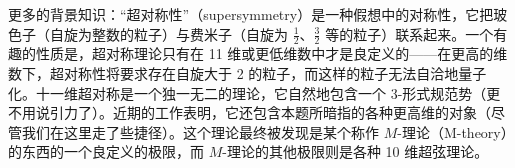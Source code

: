 更多的背景知识：“超对称性”（supersymmetry）是一种假想中的对称性，它把玻色子（自旋为整数的粒子）与费米子（自旋为 $\frac{1}{2}$、$\frac{3}{2}$ 等的粒子）联系起来。一个有趣的性质是，超对称理论只有在 11 维或更低维数中才是良定义的——在更高的维数下，超对称性将要求存在自旋大于 2 的粒子，而这样的粒子无法自洽地量子化。十一维超对称是一个独一无二的理论，它自然地包含一个 3-形式规范势（更不用说引力了）。近期的工作表明，它还包含本题所暗指的各种更高维的对象（尽管我们在这里走了些捷径）。这个理论最终被发现是某个称作 $M$-理论（M-theory）的东西的一个良定义的极限，而 $M$-理论的其他极限则是各种 10 维超弦理论。
